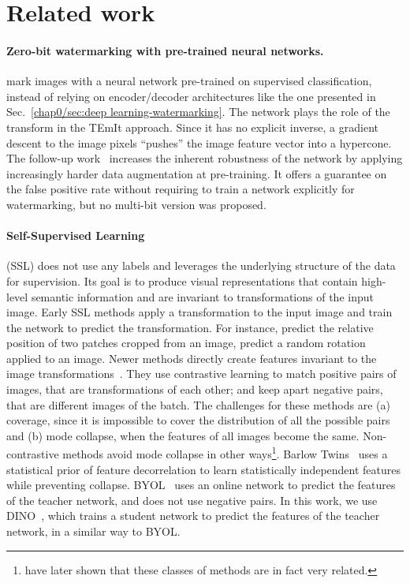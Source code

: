 
\section{Related work} \label{chap1/sec:relatedwork}

\paragraph*{Zero-bit watermarking with pre-trained neural networks.}
\cite{vukotic2018deep} mark images with a neural network pre-trained on supervised classification, instead of relying on encoder/decoder architectures like the one presented in Sec.~\ref{chap0/sec:deep learning-watermarking}.
The network plays the role of the transform in the TEmIt approach. 
Since it has no explicit inverse, a gradient descent to the image pixels ``pushes'' the image feature vector into a hypercone. 
The follow-up work~\citep{vukotic2020classification} increases the inherent robustness of the network by applying increasingly harder data augmentation at pre-training. 
It offers a guarantee on the false positive rate without requiring to train a network explicitly for watermarking, but no multi-bit version was proposed.


\paragraph*{Self-Supervised Learning}\label{chap1/par:ssl}
(SSL) does not use any labels and leverages the underlying structure of the data for supervision.
Its goal is to produce visual representations that contain high-level semantic information and are invariant to transformations of the input image.
Early SSL methods apply a transformation to the input image and train the network to predict the transformation.
For instance, \citet{doersch2015unsupervised} predict the relative position of two patches cropped from an image, 
\cite{gidaris2018unsupervised} predict a random rotation applied to an image.
Newer methods directly create features invariant to the image transformations~\citep{chen2020simclr,he2020moco}. 
They use contrastive learning to match positive pairs of images, that are transformations of each other; and keep apart negative pairs, that are different images of the batch. 
The challenges for these methods are (a) coverage, since it is impossible to cover the distribution of all the possible pairs and (b) mode collapse, when the features of all images become the same.
Non-contrastive methods avoid mode collapse in other ways\footnote{\cite{garrido2022duality} have later shown that these classes of methods are in fact very related.}.
Barlow Twins~\citep{zbontar2021barlow} uses a statistical prior of feature decorrelation to learn statistically independent features while preventing collapse.
BYOL~\citep{grill2020byol} uses an online network to predict the features of the teacher network, and does not use negative pairs.
In this work, we use DINO~\citep{caron2021dino}, which trains a student network to predict the features of the teacher network, in a similar way to BYOL.
